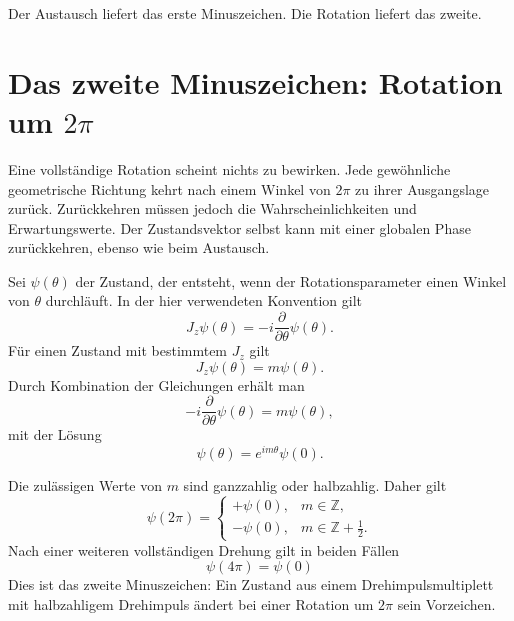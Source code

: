 Der Austausch liefert das erste Minuszeichen. Die Rotation liefert das zweite.

\section{Das zweite Minuszeichen: Rotation um \texorpdfstring{\(2\pi\)}{2 pi}}

Eine vollständige Rotation scheint nichts zu bewirken. Jede gewöhnliche geometrische Richtung kehrt nach einem Winkel von \(2\pi\) zu ihrer Ausgangslage zurück. Zurückkehren müssen jedoch die Wahrscheinlichkeiten und Erwartungswerte. Der Zustandsvektor selbst kann mit einer globalen Phase zurückkehren, ebenso wie beim Austausch.

\begin{classroomqa}
\end{classroomqa}


Sei \(\psi(\theta)\) der Zustand, der entsteht, wenn der Rotationsparameter einen Winkel von \(\theta\) durchläuft. In der hier verwendeten Konvention gilt
\begin{equation}
J_z\psi(\theta)
=
-i\frac{\partial}{\partial\theta}\psi(\theta).
\end{equation}
Für einen Zustand mit bestimmtem \(J_z\) gilt
\begin{equation}
J_z\psi(\theta)=m\psi(\theta).
\end{equation}
Durch Kombination der Gleichungen erhält man
\begin{equation}
-i\frac{\partial}{\partial\theta}\psi(\theta)
=
m\psi(\theta),
\end{equation}
mit der Lösung
\begin{equation}
\psi(\theta)=e^{im\theta}\psi(0).
\end{equation}

Die zulässigen Werte von \(m\) sind ganzzahlig oder halbzahlig. Daher gilt
\begin{equation}
\psi(2\pi)
=
\begin{cases}
+\psi(0), & m\in\mathbb Z,\\[4pt]
-\psi(0), & m\in\mathbb Z+\tfrac12.
\end{cases}
\end{equation}
Nach einer weiteren vollständigen Drehung gilt in beiden Fällen
\begin{equation}
\psi(4\pi)=\psi(0)
\end{equation}
Dies ist das zweite Minuszeichen: Ein Zustand aus einem Drehimpulsmultiplett mit halbzahligem Drehimpuls ändert bei einer Rotation um \(2\pi\) sein Vorzeichen.

